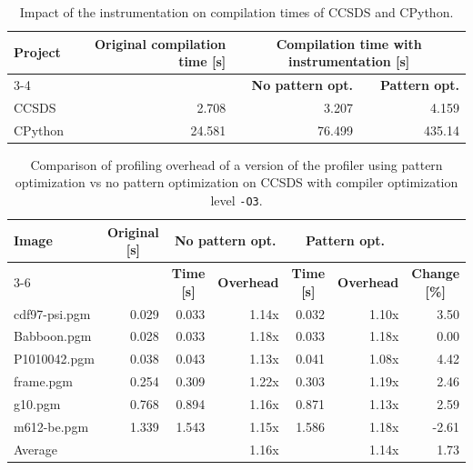 \begin{table}[]
    \centering
    {\small
    \begin{tabular}{lrrr}
        \multirow{2}{*}{\textbf{Project}} & \multirow{2}{*}{\textbf{Original compilation time [s]}} & \multicolumn{2}{c}{\textbf{Compilation time with instrumentation [s]}} \\
        \cline{3-4}
         & & \textbf{No pattern opt.} & \textbf{Pattern opt.} \\
         \hline
         \hline
         CCSDS & 2.708 & 3.207 & 4.159 \\
         CPython & 24.581 & 76.499 & 435.14 \\
    \end{tabular}
    }
    \caption{Impact of the instrumentation on compilation times of CCSDS and CPython.}
    \label{tab:compilation-overhead}
\end{table}


\begin{table}[]
    \centering
    {\small\begin{tabular}{lrrrrrr}
    \multicolumn{1}{l}{\multirow{2}{*}{\textbf{Image}}} & \multicolumn{1}{c}{\multirow{2}{*}{\textbf{Original [s]}}} & \multicolumn{2}{c}{\textbf{No pattern opt.}} & \multicolumn{2}{c}{\textbf{Pattern opt.}} \\
    \cline{3-6} 
    \multicolumn{1}{l}{} & \multicolumn{1}{c}{} & \multicolumn{1}{c}{\textbf{Time [s]}} & \multicolumn{1}{c}{\textbf{Overhead}} & \multicolumn{1}{c}{\textbf{Time [s]}} & \multicolumn{1}{c}{\textbf{Overhead}} & \multicolumn{1}{c}{\textbf{Change [\%]}} \\ 
    \hline
    \hline
    cdf97-psi.pgm  & 0.029 & 0.033 & 1.14x & 0.032 & 1.10x & 3.50 \\
    Babboon.pgm & 0.028 & 0.033 & 1.18x  & 0.033 & 1.18x & 0.00\\
    P1010042.pgm & 0.038 & 0.043 & 1.13x & 0.041 & 1.08x & 4.42 \\
    frame.pgm & 0.254 & 0.309 & 1.22x & 0.303 & 1.19x & 2.46 \\
    g10.pgm & 0.768 & 0.894 & 1.16x & 0.871 & 1.13x & 2.59\\
    m612-be.pgm & 1.339 & 1.543 & 1.15x & 1.586 & 1.18x & -2.61 \\
    \hline
    \multicolumn{1}{l}{Average} & & & 1.16x & & 1.14x & 1.73 \\
    \end{tabular}
    }
    \caption{Comparison of profiling overhead of a version of the profiler using pattern optimization vs no pattern optimization on CCSDS with compiler optimization level \texttt{-O3}.}
    \label{tab:ccsds-patterns}
\end{table}


